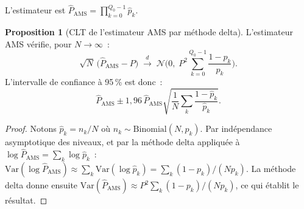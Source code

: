 \documentclass[11pt,a4paper]{article}
\theoremstyle{definition}
\newtheorem{proposition}{Proposition}[section]
\newcommand{\Var}{\mathrm{Var}}
\begin{document}
L'estimateur est $\hat P_\mathrm{AMS} = \prod_{k=0}^{Q_0-1}\hat p_k$.

\begin{proposition}[CLT de l'estimateur AMS par méthode delta]
\label{prop:ams_clt}
L'estimateur AMS vérifie, pour $N\to\infty$~:
\[
  \sqrt{N}\,\bigl(\hat P_\mathrm{AMS} - P\bigr)
  \;\xrightarrow{d}\;
  \mathcal{N}\!\biggl(0,\; P^2\sum_{k=0}^{Q_0-1}\frac{1-p_k}{p_k}\biggr).
\]
L'intervalle de confiance à 95\,\% est donc~:
\[
  \hat P_\mathrm{AMS}
  \pm 1{,}96\,\hat P_\mathrm{AMS}
  \sqrt{\frac{1}{N}\sum_k\frac{1-\hat p_k}{\hat p_k}}.
\]
\end{proposition}

\begin{proof}
Notons $\hat p_k = n_k/N$ où $n_k \sim \mathrm{Binomial}(N, p_k)$.
Par indépendance asymptotique des niveaux, et par la méthode delta appliquée à
$\log\hat P_\mathrm{AMS} = \sum_k \log\hat p_k$~:
$\Var(\log\hat P_\mathrm{AMS})\approx\sum_k\Var(\log\hat p_k) = \sum_k(1-p_k)/(N p_k)$.
La méthode delta donne ensuite
$\Var(\hat P_\mathrm{AMS}) \approx P^2\sum_k(1-p_k)/(Np_k)$,
ce qui établit le résultat.
\end{proof}
\end{document}
